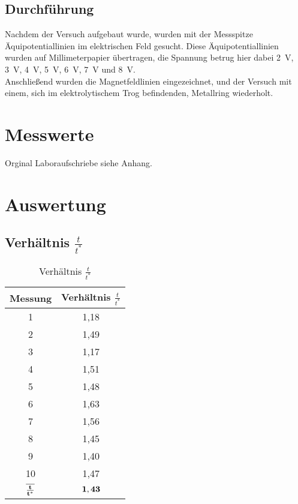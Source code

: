 \documentclass[a4paper,12pt,fleqn,oneside]{article}
\begin{document}
\newpage
\subsection{Durchführung}
	Nachdem der Versuch aufgebaut wurde, wurden mit der Messspitze Äquipotentiallinien im elektrischen Feld gesucht. Diese 
	Äquipotentiallinien wurden auf Millimeterpapier übertragen, die Spannung betrug hier dabei \SI{2}{\volt}, \SI{3}{\volt},
	\SI{4}{\volt}, \SI{5}{\volt}, \SI{6}{\volt}, \SI{7}{\volt} und \SI{8}{\volt}.\\
	Anschließend wurden die Magnetfeldlinien 
	eingezeichnet, und der Versuch mit einem, sich im elektrolytischem Trog befindenden, Metallring wiederholt.


\newpage
\section{Messwerte}
	Orginal Laboraufschriebe siehe Anhang.
	

	
	\begin{figure}
	
	\end{figure}

	

\newpage
\section{Auswertung}
	\subsection{Verhältnis $\frac{t}{t^{\ast}}$}
	\begin{table}[h!]
	\centering
	\begin{tabular}{c|c}
		Messung 						& Verhältnis $\frac{t}{t^{\ast}}$	\\ \hline
		1							& 1,18						\\ \hline
		2							& 1,49						\\ \hline
		3							& 1,17						\\ \hline
		4							& 1,51						\\ \hline
		5							& 1,48						\\ \hline
		6							& 1,63						\\ \hline
		7							& 1,56						\\ \hline
		8							& 1,45						\\ \hline
		9							& 1,40						\\ \hline
		10							& 1,47						\\ \hline
		$\bf\overline{\frac{t}{t^{\ast}}}$	& $\bf1,43$
	\end{tabular}
	\caption{Verhältnis $\frac{t}{t^{\ast}}$}
	\label{tab:tzut*}
	\end{table}
\end{document}
